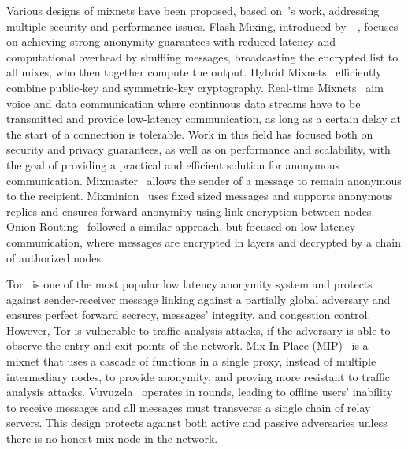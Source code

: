 Various designs of mixnets have been proposed, based on~\citeauthor{Chaum2003}'s work, addressing multiple security and performance issues. Flash Mixing, introduced by~\citeauthor{FlashMixing}~\cite{FlashMixing}, focuses on achieving strong anonymity guarantees with reduced latency and computational overhead by shuffling messages, broadcasting the encrypted list to all mixes, who then together compute the output. Hybrid Mixnets~\cite*{HybridMixJakobsson, HybridMixMiyako} efficiently combine public-key and symmetric-key cryptography. Real-time Mixnets~\cite{RealTimeMix} aim voice and data communication where continuous data streams have to be transmitted and provide low-latency communication, as long as a certain delay at the start of a connection is tolerable.
Work in this field has focused both on security and privacy guarantees, as well as on performance and scalability, with the goal of providing a practical and efficient solution for anonymous communication. Mixmaster~\cite{Mixmaster} allows the sender of a message to remain anonymous to the recipient. Mixminion~\cite{Mixminion} uses fixed sized messages and supports anonymous replies and ensures forward anonymity using link encryption between nodes.
Onion Routing~\cite{OnionRouting} followed a similar approach, but focused on low latency communication, where messages are encrypted in layers and decrypted by a chain of authorized nodes. 

Tor~\cite{dingledine2004tor} is one of the most popular low latency anonymity system and protects against sender-receiver message linking against a partially global adversary and ensures perfect forward secrecy, messages' integrity, and congestion control. However, Tor is vulnerable to traffic analysis attacks, if the adversary is able to observe the entry and exit points of the network.
Mix-In-Place (MIP)~\cite{MixInPlace} is a mixnet that uses a cascade of functions in a single proxy, instead of multiple intermediary nodes, to provide anonymity, and proving more resistant to traffic analysis attacks. 
Vuvuzela~\cite{Vuvuzela} operates in rounds, leading to offline users' inability to receive messages and all messages must transverse a single chain of relay servers. This design protects against both active and passive adversaries unless there is no honest mix node in the network.

